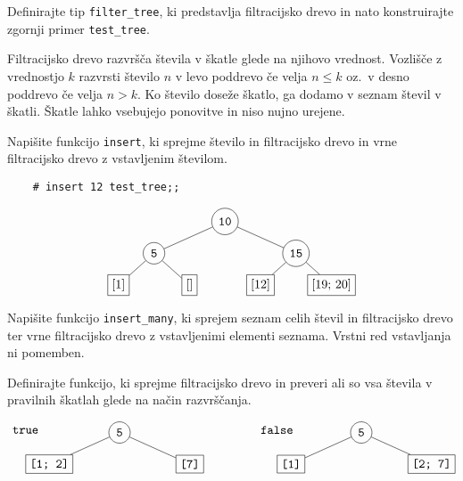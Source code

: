 \documentclass[arhiv]{../izpit}
\begin{document}
\podnaloga
  Definirajte tip \texttt{filter\_tree}, ki predstavlja filtracijsko drevo in
  nato konstruirajte zgornji primer \texttt{test\_tree}.

\podnaloga
  Filtracijsko drevo razvršča števila v škatle glede na njihovo vrednost.
  Vozlišče z vrednostjo $k$ razvrsti število $n$ v levo poddrevo če velja
  $n \leq k$ oz.\ v desno poddrevo če velja $n > k$.
  Ko število doseže škatlo, ga dodamo v seznam števil v škatli.
  Škatle lahko vsebujejo ponovitve in niso nujno urejene.

  Napišite funkcijo \texttt{insert}, ki sprejme število in filtracijsko drevo in
  vrne filtracijsko drevo z vstavljenim številom.

  \begin{verbatim}
    # insert 12 test_tree;;
  \end{verbatim}
  \[
    \begin{tikzpicture}[level distance=0.9cm,
      level 1/.style={sibling distance=4cm},
      level 2/.style={sibling distance=2cm},
      level 3/.style={sibling distance=2cm}
      ]
      \node[circle, draw] {\texttt{10}}
        child {node[circle, draw] {\texttt{5}}
          child {node[rectangle, draw] {[1]}}
          child {node[rectangle, draw] {[]}}
        }
        child {node[circle, draw] {\texttt{15}}
          child {node[rectangle, draw] {[12]}}
          child {node[rectangle, draw] {[19; 20]}}
        };
    \end{tikzpicture}
  \]

\podnaloga
  Napišite funkcijo \texttt{insert\_many}, ki sprejem seznam celih števil in
  filtracijsko drevo ter vrne filtracijsko drevo z vstavljenimi elementi seznama.
  Vrstni red vstavljanja ni pomemben.

\podnaloga
  Definirajte funkcijo, ki sprejme filtracijsko drevo in preveri ali
  so vsa števila v pravilnih škatlah glede na način razvrščanja.

  \[
    \begin{tikzpicture}[level distance=0.9cm,
      level 1/.style={sibling distance=4cm},
      level 2/.style={sibling distance=2cm}
      ]
      \node[circle, draw] {\texttt{5}}
        child {node[rectangle, draw] {\texttt{[1; 2]}}}
        child {node[rectangle, draw] {\texttt{[7]}}};

      \node[align=left,yshift=5mm] at (current bounding box.west) {\texttt{true}};
    \end{tikzpicture}
    \hspace{15mm}
    \begin{tikzpicture}[level distance=0.9cm,
      level 1/.style={sibling distance=4cm},
      level 2/.style={sibling distance=2cm}
      ]
      \node[circle, draw] {\texttt{5}}
        child {node[rectangle, draw] {\texttt{[1]}}}
        child {node[rectangle, draw] {\texttt{[2; 7]}}};

      \node[align=left,yshift=5mm] at (current bounding box.west) {\texttt{false}};
    \end{tikzpicture}
  \]
\end{document}
